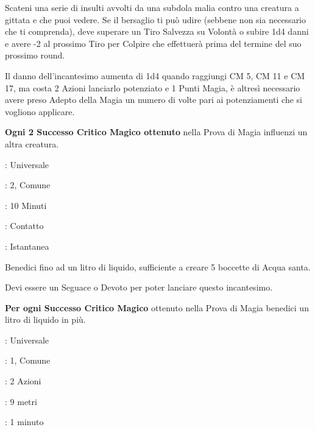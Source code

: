 \begin{multicols}{2}
Scateni una serie di insulti avvolti da una subdola malia contro una creatura a gittata e che puoi vedere. Se il bersaglio ti può udire (sebbene non sia necessario che ti comprenda), deve superare un Tiro Salvezza su Volontà o subire 1d4 danni e avere -2 al prossimo Tiro per Colpire che effettuerà prima del termine del suo prossimo round.

Il danno dell'incantesimo aumenta di 1d4 quando raggiungi CM 5, CM 11 e CM 17, ma costa 2 Azioni lanciarlo potenziato e 1 Punti Magia, è altresì necessario avere preso Adepto della Magia un numero di volte pari ai potenziamenti che si vogliono applicare.

\textbf{Ogni 2 Successo Critico Magico ottenuto} nella Prova di Magia influenzi un altra creatura.

\noindent\colorbox{OBSSgold!10}{
\begin{minipage}{0.95\linewidth}
\begin{description}[noitemsep, topsep=0pt, parsep=0pt, partopsep=0pt, leftmargin=0cm, labelwidth=1.3cm]
	\item[\textbf{Lista}]: Universale
	\item[\textbf{Livello}]: 2, Comune
	\item[\textbf{Lancio}]: 10 Minuti
	\item[\textbf{Gittata}]: Contatto
	\item[\textbf{Durata}]: Istantanea
\end{description}
\end{minipage}}\smallskip

Benedici fino ad un litro di liquido, sufficiente a creare 5 boccette di Acqua santa.

Devi essere un Seguace o Devoto per poter lanciare questo incantesimo.

\textbf{Per ogni Successo Critico Magico} ottenuto nella Prova di Magia benedici un litro di liquido in più.

\noindent\colorbox{OBSSgold!10}{
\begin{minipage}{0.95\linewidth}
\begin{description}[noitemsep, topsep=0pt, parsep=0pt, partopsep=0pt, leftmargin=0cm, labelwidth=1.3cm]
	\item[\textbf{Lista}]: Universale
	\item[\textbf{Livello}]: 1, Comune
	\item[\textbf{Lancio}]: 2 Azioni
	\item[\textbf{Gittata}]: 9 metri
	\item[\textbf{Durata}]: 1 minuto
\end{description}
\end{minipage}}\smallskip


\end{multicols}
